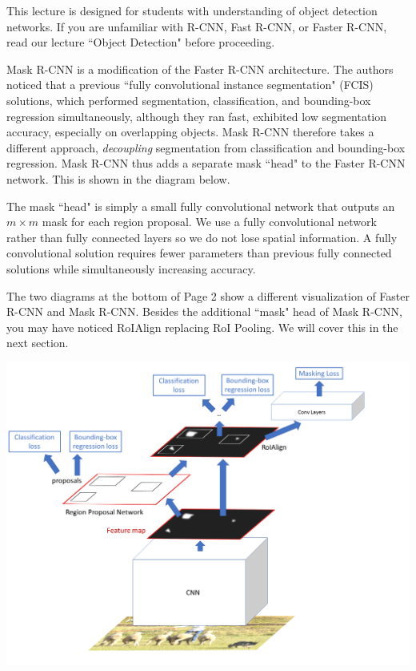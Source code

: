 This lecture is designed for students with understanding of object detection networks. If you are unfamiliar with R-CNN, Fast R-CNN, or Faster R-CNN, read our lecture ``Object Detection" before proceeding.

Mask R-CNN is a modification of the Faster R-CNN architecture. The authors noticed that a previous ``fully convolutional instance segmentation" (FCIS) solutions, which performed segmentation, classification, and bounding-box regression simultaneously, although they ran fast, exhibited low segmentation accuracy, especially on overlapping objects. Mask R-CNN therefore takes a different approach, \textit{decoupling} segmentation from classification and bounding-box regression. Mask R-CNN thus adds a separate mask ``head" to the Faster R-CNN network. This is shown in the diagram below.

The mask ``head" is simply a small fully convolutional network that outputs an $m\times m$ mask for each region proposal. We use a fully convolutional network rather than fully connected layers so we do not lose spatial information. A fully convolutional solution requires fewer parameters than previous fully connected solutions while simultaneously increasing accuracy.

The two diagrams at the bottom of Page 2 show a different visualization of Faster R-CNN and Mask R-CNN. Besides the additional ``mask" head of Mask R-CNN, you may have noticed RoIAlign replacing RoI Pooling. We will cover this in the next section.

\begin{center}
	\includegraphics[scale=0.36]{images/masknetwork.png}
\end{center}


